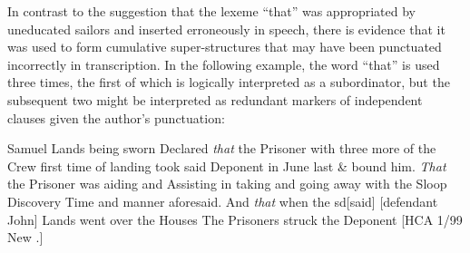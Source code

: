   In contrast to the suggestion that the lexeme “that” was appropriated by uneducated sailors and inserted erroneously in speech, there is evidence that it was used to form cumulative super-structures that may have been punctuated incorrectly in transcription. In the following example, the word “that” is used three times, the first of which is logically interpreted as a subordinator, but the subsequent two might be interpreted as redundant markers of independent clauses given the author’s punctuation:

Samuel Lands being sworn Declared \textit{that} the Prisoner with three more of the Crew first time of landing took said Deponent in June last \& bound him. \textit{That} the Prisoner was aiding and Assisting in taking and going away with the Sloop Discovery Time and manner aforesaid. And \textit{that} when the sd[said] [defendant John] Lands went over the Houses The Prisoners struck the Deponent [HCA 1/99 New \citealt{Providence1722}.] 

